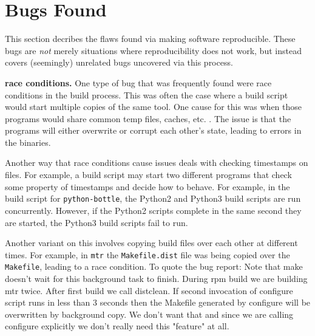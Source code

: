 \section{Bugs Found}
\label{SEC:bugs}

This section decribes the flaws found via making software reproducible.  These
bugs are \emph{not} merely situations where reproducibility does not work, but
instead covers (seemingly) unrelated bugs uncovered via this process.



{\bf race conditions.}
One type of bug that was frequently found were race conditions in the build
process.  This was often the case where a build script would start multiple
copies of the same tool.  One cause for this was when those programs would 
share common temp files, caches, etc. .  The issue is that the
programs will either overwrite or corrupt each other's state, leading to
errors in the binaries.  

Another way that race conditions cause issues deals with checking
timestamps on files.  For example, a build script may start two different
programs that check some property of timestamps and decide how to behave.
For example, in the build script for {\tt python-bottle}, the Python2 and 
Python3 build scripts are run concurrently.  However, if the Python2
scripts complete in the same second they are started, the Python3 build
scripts fail to run.  


Another variant on this involves copying build files over each other at
different times.  For example, in {\tt mtr} the {\tt Makefile.dist} file 
was being copied over the {\tt Makefile}, leading to a race condition.
To quote the bug report:
Note that make doesn't wait for this background task to finish. During
rpm build we are building mtr twice. After first build we call
distclean. If second invocation of configure script runs in less than 3
seconds then the Makefile generated by configure will be overwritten by
background copy. We don't want that and since we are calling configure
explicitly we don't really need this "feature" at all.
